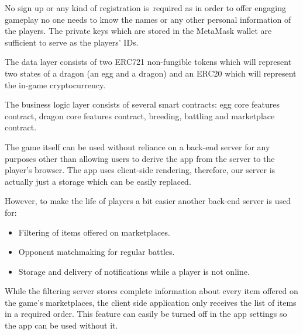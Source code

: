 \documentclass[12pt]{article}
\begin{document}
No sign up or any kind of registration is\ required as in order to offer engaging gameplay no one  needs to know the names or any other personal information of the players. The private keys which are stored in the MetaMask wallet are sufficient to serve as the players’ IDs.\par

The data layer consists of two ERC721  \cite{Ethereum_2017_Sep_26}  non-fungible tokens which will represent two states of a dragon (an egg and a dragon) and an ERC20  \cite{Ethereum_2015_Nov_19}  which will represent the in-game cryptocurrency. \par

The business logic layer consists of several smart contracts: egg core features contract, dragon core features contract, breeding, battling and marketplace contract.\par

The game itself can be used without reliance on a back-end server for any purposes other than allowing users to derive the app from the server to the player’s browser. The app uses client-side rendering, therefore, our server is actually just a storage which can be easily replaced.\par

\begin{samepage}
However, to make the life of players a bit easier another back-end server is used for:\par

\begin{itemize}
	\item Filtering of items offered on marketplaces.\par

	\item Opponent matchmaking for regular battles.\par

	\item Storage and delivery of notifications while a player is not online.
\end{itemize}\par
\end{samepage}

While the filtering server stores complete information about every item offered on the game’s marketplaces, the client side application only receives the list of items in a required order. This feature can easily be turned off in the app settings so the app can be used without it.\par
\end{document}

